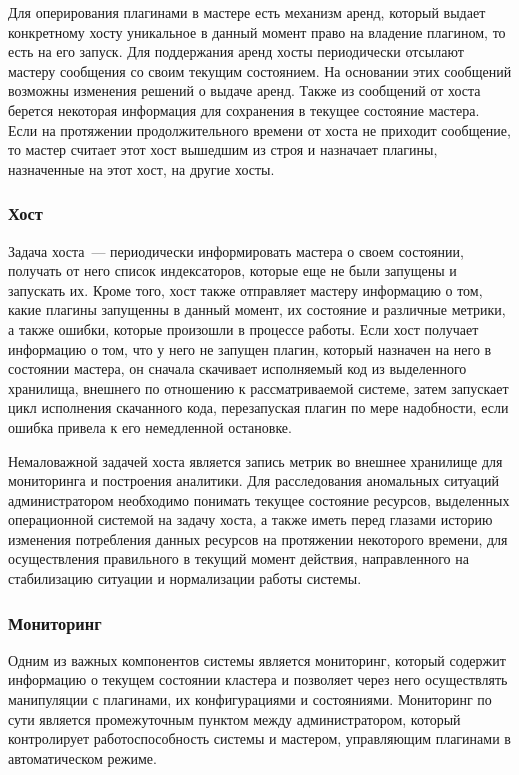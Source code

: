 Для оперирования плагинами в мастере есть механизм аренд, который выдает конкретному хосту уникальное в данный момент право на владение плагином, то есть на его запуск. Для поддержания аренд хосты периодически отсылают мастеру сообщения со своим текущим состоянием. На основании этих сообщений возможны изменения решений о выдаче аренд. Также из сообщений от хоста берется некоторая информация для сохранения в текущее состояние мастера. Если на протяжении продолжительного времени от хоста не приходит сообщение, то мастер считает этот хост вышедшим из строя и назначает плагины, назначенные на этот хост, на другие хосты.

\subsubsection{Хост}

Задача хоста~--- периодически информировать мастера о своем состоянии, получать от него список индексаторов, которые еще не были запущены и запускать их. Кроме того, хост также отправляет мастеру информацию о том, какие плагины запущенны в данный момент, их состояние и различные метрики, а также ошибки, которые произошли в процессе работы. Если хост получает информацию о том, что у него не запущен плагин, который назначен на него в состоянии мастера, он сначала скачивает исполняемый код из выделенного хранилища, внешнего по отношению к рассматриваемой системе, затем запускает цикл исполнения скачанного кода, перезапуская плагин по мере надобности, если ошибка привела к его немедленной остановке.

Немаловажной задачей хоста является запись метрик во внешнее хранилище для мониторинга и построения аналитики. Для расследования аномальных ситуаций администратором необходимо понимать текущее состояние ресурсов, выделенных операционной системой на задачу хоста, а также иметь перед глазами историю изменения потребления данных ресурсов на протяжении некоторого времени, для осуществления правильного в текущий момент действия, направленного на стабилизацию ситуации и нормализации работы системы.

\subsubsection{Мониторинг}

Одним из важных компонентов системы является мониторинг, который содержит информацию о текущем состоянии кластера и позволяет через него осуществлять манипуляции с плагинами, их конфигурациями и состояниями. Мониторинг по сути является промежуточным пунктом между администратором, который контролирует работоспособность системы и мастером, управляющим плагинами в автоматическом режиме. 

\clearpage
